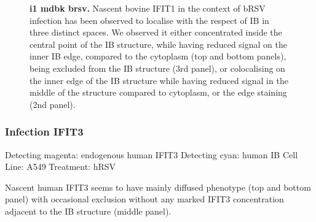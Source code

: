 \begin{figure}
\begin{subfigure}{1\textwidth}
    \end{subfigure}
    \caption[i1 mdbk brsv]{\textbf{i1 mdbk brsv.} Nascent bovine IFIT1 in the context of bRSV infection has been observed to localise with the respect of IB in three distinct spaces. We observed it either concentrated inside the central point of the IB structure, while having reduced signal on the inner IB edge, compared to the cytoplasm (top and bottom panels), being excluded from the IB structure (3rd panel), or colocalising on the inner edge of the IB structure while having reduced signal in the middle of the structure compared to cytoplasm, or the edge staining (2nd panel).}
    \label{fig:i1 mdbk brsv}
\end{figure}


\subsubsection{Infection IFIT3}
Detecting magenta: endogenous human IFIT3 \newline
Detecting cyan: human IB \newline
Cell Line: A549 \newline
Treatment: hRSV \newline

Nascent human IFIT3 seems to have mainly diffused phenotype (top and bottom panel) with occasional exclusion without any marked IFIT3 concentration adjacent to the IB structure (middle panel).

